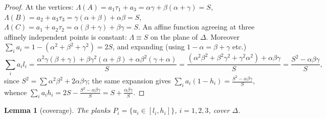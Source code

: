\documentclass{aims}
\numberwithin{equation}{section}
\theoremstyle{plain}
\newtheorem{lemma}[theorem]{Lemma}
\theoremstyle{definition}
\theoremstyle{remark}
\begin{document}
\begin{proof}
At the vertices:
$\Lambda(A)=a_1\tau_1+a_3=\alpha\gamma+\beta(\alpha+\gamma)=S$,
$\Lambda(B)=a_2+a_3\tau_3=\gamma(\alpha+\beta)+\alpha\beta=S$,
$\Lambda(C)=a_1+a_2\tau_2=\alpha(\beta+\gamma)+\beta\gamma=S$. An affine
function agreeing at three affinely independent points is constant:
$\Lambda\equiv S$ on the plane of $\Delta$. Moreover
$\sum_ia_i=1-(\alpha^2+\beta^2+\gamma^2)=2S$, and expanding (using
$1-\alpha=\beta+\gamma$ etc.)
\[
\textstyle\sum_i a_il_i
=\frac{\alpha^2\gamma(\beta+\gamma)+\beta\gamma^2(\alpha+\beta)
+\alpha\beta^2(\gamma+\alpha)}{S}
=\frac{(\alpha^2\beta^2+\beta^2\gamma^2+\gamma^2\alpha^2)+\alpha\beta\gamma}{S}
=\frac{S^2-\alpha\beta\gamma}{S},
\]
since $S^2=\sum\alpha^2\beta^2+2\alpha\beta\gamma$; the same expansion gives
$\sum_ia_i(1-h_i)=\frac{S^2-\alpha\beta\gamma}S$, whence
$\sum_ia_ih_i=2S-\frac{S^2-\alpha\beta\gamma}S=S+\frac{\alpha\beta\gamma}S$.
\end{proof}

\begin{lemma}[coverage]\label{lem:coverage}
The planks $P_i=\{u_i\in[l_i,h_i]\}$, $i=1,2,3$, cover $\Delta$.
\end{lemma}
\end{document}
